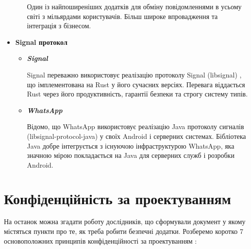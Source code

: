 \begin{itemize}
\begin{itemize}
                Один із найпоширеніших додатків для обміну повідомленнями в усьому світі з мільярдами користувачів. Більш широке впровадження та інтеграція з бізнесом.
        \end{itemize}
        
    \item \textbf{Signal протокол}
        \begin{itemize}
            \item \textbf{\textit{Signal}}
                
                Signal переважно використовує реалізацію протоколу Signal (libsignal) \cite{libsignal_rust}, що імплементована на Rust у його сучасних версіях. Перевага віддається Rust через його продуктивність, гарантії безпеки та строгу систему типів.
            \item \textbf{\textit{WhatsApp}}
                
                Відомо, що WhatsApp використовує реалізацію Java протоколу сигналів (libsignal-protocol-java) \cite{libsignal_protocol_java} у своїх Android і серверних системах. Бібліотека Java добре інтегрується з існуючою інфраструктурою WhatsApp, яка значною мірою покладається на Java для серверних служб і розробки Android.
        \end{itemize}
        
\end{itemize}


\chapter{Конфіденційність за проектуванням}

На останок можна згадати роботу дослідників, що сформували документ у якому містяться пункти про те, як треба робити безпечні додатки. Розберемо коротко 7 основоположних принципів конфіденційності за проектуванням \cite{cavoukian_privacy_by_design}:

